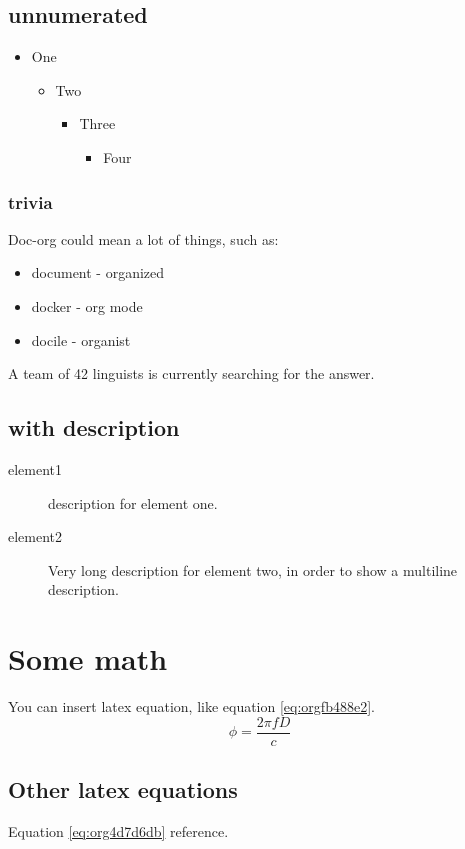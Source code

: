 \subsection{unnumerated}
\label{sec:org3e4ea35}
\begin{itemize}
\item One
\begin{itemize}
\item Two
\begin{itemize}
\item Three
\begin{itemize}
\item Four
\end{itemize}
\end{itemize}
\end{itemize}
\end{itemize}

\subsubsection{trivia}
\label{sec:org90b5b17}
Doc-org could mean a lot of things, such as:
\begin{itemize}
\item document - organized
\item docker - org mode
\item docile - organist
\end{itemize}
A team of 42 linguists is currently searching for the answer.
\subsection{with description}
\label{sec:org50e7309}
\begin{description}
\item[{element1}] description for element one.
\item[{element2}] Very long description for element two, in order to show a
multiline description.
\end{description}

\section{Some math}
\label{sec:org736e91b}
You can insert latex equation, like equation \ref{eq:orgfb488e2}.
\begin{equation}
\label{eq:orgfb488e2}
\phi = \frac{2\pi fD}{c}
\end{equation}
\subsection{Other latex equations}
\label{sec:org9500a05}
Equation \ref{eq:org4d7d6db} reference.

